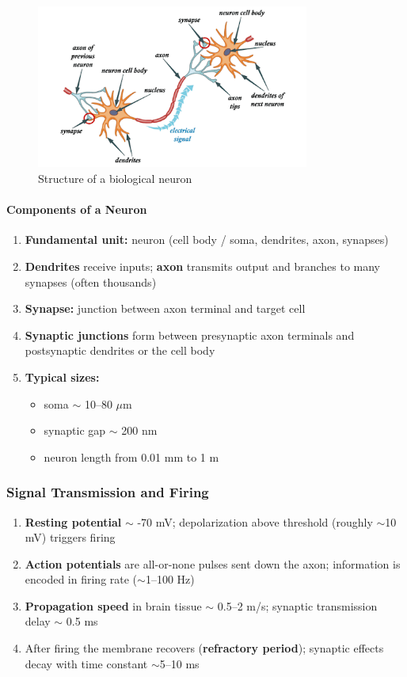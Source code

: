 \begin{figure}[h!]
\centering
\includegraphics[width=0.8\textwidth]{figures/biological_neuron.png}
\caption{Structure of a biological neuron}
\label{fig:biological-neuron}
\end{figure}

\paragraph{Components of a Neuron}
\label{para:neuron-components}

\begin{enumerate}
\item \textbf{Fundamental unit:} neuron (cell body / soma, dendrites, axon, synapses)
\item \textbf{Dendrites} receive inputs; \textbf{axon} transmits output and branches to many synapses (often thousands)
\item \textbf{Synapse:} junction between axon terminal and target cell
\item \textbf{Synaptic junctions} form between presynaptic axon terminals and postsynaptic dendrites or the cell body
\item \textbf{Typical sizes:}
\begin{itemize}
\item soma $\sim$ 10–80 $\mu$m
\item synaptic gap $\sim$ 200 nm
\item neuron length from 0.01 mm to 1 m
\end{itemize}
\end{enumerate}

\subsubsection{Signal Transmission and Firing}
\label{subsubsec:signal-transmission}

\begin{enumerate}
\item \textbf{Resting potential} $\sim$ -70 mV; depolarization above threshold (roughly $\sim$10 mV) triggers firing
\item \textbf{Action potentials} are all-or-none pulses sent down the axon; information is encoded in firing rate ($\sim$1–100 Hz)
\item \textbf{Propagation speed} in brain tissue $\sim$ 0.5–2 m/s; synaptic transmission delay $\sim$ 0.5 ms
\item After firing the membrane recovers (\textbf{refractory period}); synaptic effects decay with time constant $\sim$5–10 ms
\end{enumerate}

